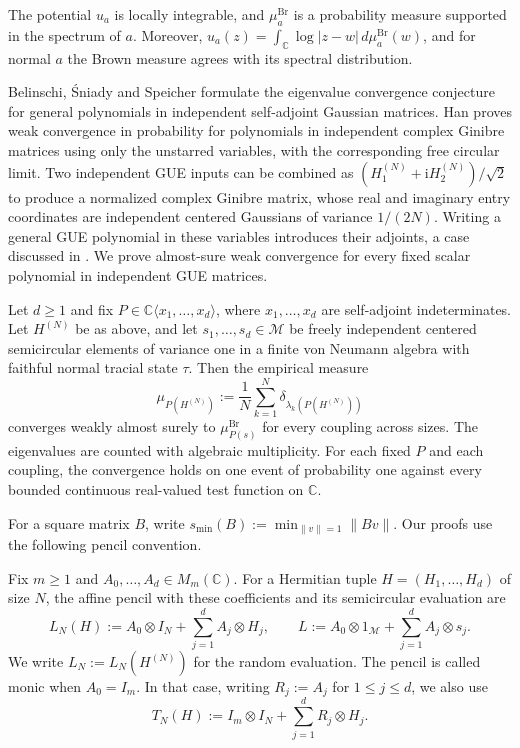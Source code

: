 The potential $u_a$ is locally integrable, and $\mu_a^{\mathrm{Br}}$ is a probability measure supported in the spectrum of $a$.
Moreover, $u_a(z)=\int_{\mathbb C}\log|z-w|\,d\mu_a^{\mathrm{Br}}(w)$, and for normal $a$ the Brown measure agrees with its spectral distribution.

Belinschi, Śniady and Speicher \cite[Section~7]{BSS18} formulate the eigenvalue convergence conjecture for general polynomials in independent self-adjoint Gaussian matrices.
Han \cite[Theorem~1.2]{Han26} proves weak convergence in probability for polynomials in independent complex Ginibre matrices using only the unstarred variables, with the corresponding free circular limit.
Two independent GUE inputs can be combined as $(H_1^{(N)}+\mathrm{i}H_2^{(N)})/\sqrt{2}$ to produce a normalized complex Ginibre matrix, whose real and imaginary entry coordinates are independent centered Gaussians of variance $1/(2N)$.
Writing a general GUE polynomial in these variables introduces their adjoints, a case discussed in \cite[Question~1.8]{Han26}.
We prove almost-sure weak convergence for every fixed scalar polynomial in independent GUE matrices.

\begin{theorem}\label{thm:brown}
Let $d\ge 1$ and fix $P\in\mathbb C\langle x_1,\ldots,x_d\rangle$, where $x_1,\ldots,x_d$ are self-adjoint indeterminates.
Let $H^{(N)}$ be as above, and let $s_1,\ldots,s_d\in\mathcal M$ be freely independent centered semicircular elements of variance one in a finite von Neumann algebra with faithful normal tracial state $\tau$.
Then the empirical measure
\[
 \mu_{P(H^{(N)})}:=\frac1N\sum_{k=1}^{N}\delta_{\lambda_k(P(H^{(N)}))}
\]
converges weakly almost surely to $\mu_{P(s)}^{\mathrm{Br}}$ for every coupling across sizes.
The eigenvalues are counted with algebraic multiplicity.
For each fixed $P$ and each coupling, the convergence holds on one event of probability one against every bounded continuous real-valued test function on $\mathbb C$.
\end{theorem}

For a square matrix $B$, write $s_{\min}(B):=\min_{\|v\|=1}\|Bv\|$.
Our proofs use the following pencil convention.

\begin{definition}\label{def:pencil}
Fix $m\ge1$ and $A_0,\ldots,A_d\in M_m(\mathbb C)$.
For a Hermitian tuple $H=(H_1,\ldots,H_d)$ of size $N$, the affine pencil with these coefficients and its semicircular evaluation are
\begin{equation}\label{eq:affine-pencil}
 L_N(H):=A_0\otimes I_N+\sum_{j=1}^d A_j\otimes H_j,\qquad
 L:=A_0\otimes 1_{\mathcal M}+\sum_{j=1}^d A_j\otimes s_j .
\end{equation}
We write $L_N:=L_N(H^{(N)})$ for the random evaluation.
The pencil is called monic when $A_0=I_m$.
In that case, writing $R_j:=A_j$ for $1\le j\le d$, we also use
\begin{equation}\label{eq:pencil}
 T_N(H):=I_m\otimes I_N+\sum_{j=1}^d R_j\otimes H_j.
\end{equation}
\end{definition}

